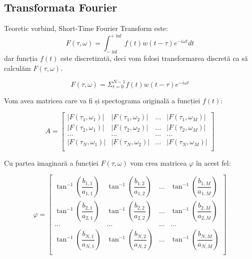 \documentclass[12pt]{article}
\begin{document}
\subsection{Transformata Fourier}\label{Modelul}

Teoretic vorbind, Short-Time Fourier Transform este:
\begin{equation}
    F(\tau,\omega)=\int_{-\inf}^{+\inf}f(t)w(t-\tau)e^{-i\omega t}dt
\end{equation}
 dar funcția $f(t)$ este discretizată, deci vom folosi transformarea discretă ca să calculăm $F(\tau,\omega)$.

\begin{equation}
    F(\tau,\omega) = \Sigma_{t=0}^{N-1} f(t) w(t-\tau) e^{-i\omega t}
\end{equation}

Vom avea matricea care va fi și spectograma originală a funcției $f(t)$:

\begin{equation}
	A = \begin{bmatrix}
		|F(\tau_{1},\omega_{1})| & |F(\tau_{1},\omega_{2})| & ... & |F(\tau_{1},\omega_{M})| \\
        |F(\tau_{2},\omega_{1})| & |F(\tau_{2},\omega_{2})| & ... & |F(\tau_{2},\omega_{M})| \\
        ... & ... & ... & ... \\
        |F(\tau_{N},\omega_{1})| & |F(\tau_{N},\omega_{2})| & ... & |F(\tau_{N},\omega_{M})| \\
	\end{bmatrix}
\end{equation}

Cu partea imaginară a funcției $F(\tau,\omega)$ vom crea matricea $\varphi$ în acest fel:

\begin{equation}
	\varphi = \begin{bmatrix}
		\tan^{-1}(\dfrac{b_{1,1}}{a_{1,1}}) & \tan^{-1}(\dfrac{b_{1,2}}{a_{1,2}}) & ... & \tan^{-1}(\dfrac{b_{1,M}}{a_{1,M}}) \\
        \tan^{-1}(\dfrac{b_{2,1}}{a_{2,1}}) & \tan^{-1}(\dfrac{b_{2,2}}{a_{2,2}}) & ... & \tan^{-1}(\dfrac{b_{2,M}}{a_{2,M}}) \\
        ... & ... & ... & ... \\
        \tan^{-1}(\dfrac{b_{N,1}}{a_{N,1}}) & \tan^{-1}(\dfrac{b_{N,2}}{a_{N,2}}) & ... & \tan^{-1}(\dfrac{b_{N,M}}{a_{N,M}}) \\
	\end{bmatrix}
\end{equation}
\end{document}
